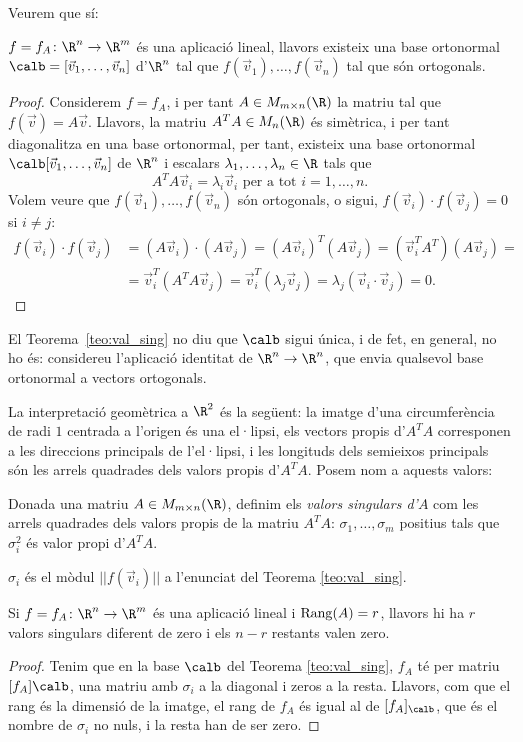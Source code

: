 Veurem que sí:
\begin{teorema}\label{teo:val_sing}
$f=f_A\colon \R^n \to \R^m$ és una aplicació lineal, llavors existeix una base ortonormal $\calb=[\vec v_1, \dots, \vec v_n]$ d'$\R^n$ tal que $f(\vec v_1), \dots, f(\vec v_n)$ tal que són ortogonals.
\end{teorema}
\begin{proof}
Considerem $f=f_A$, i per tant $A\in M_{m\times n}(\R)$ la matriu tal que $f(\vec v)=A\vec v$. Llavors, la matriu $A^TA\in M_n(\R)$ és simètrica, i per tant diagonalitza en una base ortonormal, per tant, existeix una base ortonormal $\calb[\vec v_1, \dots, \vec v_n]$ de $\R^n$ i escalars $\lambda_1, \dots, \lambda_n\in \R$ tals que
\[
A^T A \vec v_i=\lambda_i \vec v_i \text{ per a tot $i=1, \dots, n$.}
\]
Volem veure que $f(\vec v_1), \dots, f(\vec v_n)$ són ortogonals, o sigui, $f(\vec v_i)\cdot f(\vec v_j)=0$ si $i\neq j$:
\begin{align*}
f(\vec v_i)\cdot f(\vec v_j) & =(A\vec v_i)\cdot(A\vec v_j)=(A\vec v_i)^T(A\vec v_j)=(\vec v_i^T A^T)(A \vec v_j)= \\
 &  = \vec v_i^T (A^T A \vec v_j)=\vec v_i^T (\lambda_j \vec v_j)=\lambda_j (\vec v_i \cdot \vec v_j)=0 .
\end{align*}
\end{proof}
\begin{observacio}
El Teorema~\ref{teo:val_sing} no diu que $\calb$ sigui única, i de fet, en general, no ho és: considereu l'aplicació identitat de $\R^n \to \R^n$, que envia qualsevol base ortonormal a vectors ortogonals.
\end{observacio}

 La interpretació geomètrica a $\R^2$ és la següent: la imatge d'una circumferència de radi $1$ centrada a l'origen és una el·lipsi, els vectors propis d'$A^TA$ corresponen a les direccions principals de l'el·lipsi, i les longituds dels semieixos principals són les arrels quadrades dels valors propis d'$A^TA$. Posem nom a aquests valors:
 \begin{definicio}
 Donada una matriu $A\in M_{m\times n}(\R)$, definim els \emph{valors singulars d'$A$} com les arrels quadrades dels valors propis de la matriu $A^TA$: $\sigma_1, \dots, \sigma_m$ positius tals que $\sigma_i^2$ és valor propi d'$A^TA$.
 \end{definicio}
 \begin{observacio}
 $\sigma_i$ és el mòdul $||f(\vec v_i)||$ a l'enunciat del Teorema \ref{teo:val_sing}.
 \end{observacio}
 \begin{proposicio}
 Si $f=f_A\colon \R^n \to \R^m$ és una aplicació lineal i $\operatorname{Rang}(A)=r$, llavors hi ha $r$ valors singulars diferent de zero i els $n-r$ restants valen zero.
 \end{proposicio}
\begin{proof}
Tenim que en la base $\calb$ del Teorema \ref{teo:val_sing}, $f_A$ té per matriu $[f_A]\calb$, una matriu amb $\sigma_i$ a la diagonal i zeros a la resta. Llavors, com que el rang és la dimensió de la imatge, el rang de $f_A$  és igual al de $[f_A]_\calb$, que és el nombre de $\sigma_i$ no nuls, i la resta han de ser zero.
\end{proof}

